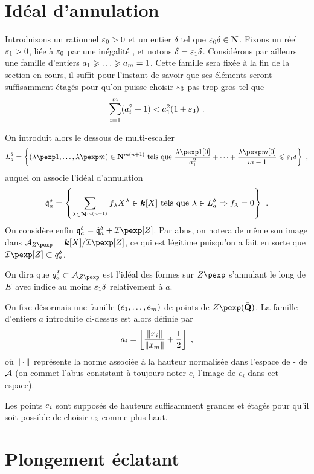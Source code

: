 \section{Idéal d'annulation}

Introduisons un rationnel $\varepsilon_0 > 0$ et un entier $\delta$ tel que
$\varepsilon_0\delta \in \mathbf{N}$. Fixons un réel $\varepsilon_1 > 0$, liée à $\varepsilon_0$ par une
inégalité , et notons $\tilde\delta =
\varepsilon_1\delta$.
Considérons par ailleurs une famille d'entiers $a_1 \ge \dots \ge a_\puiss =
1$. Cette famille sera fixée à la fin de la section en cours, il suffit pour
l'instant de savoir que ses éléments seront suffisamment étagés pour qu'on
puisse choisir $\varepsilon_3$ pas trop gros \todo[à expliciter] tel que
\[
  \sum_{i=1}^{m} (a_i^2 +1) < a_1^2 (1 + \varepsilon_3) \text{ .}
\]

On introduit alors le dessous de multi-escalier
\[
  L_a^\delta = \left\{
  (\lambda\pexp1, \ldots, \lambda\pexp\puiss) \in \N^{\puiss(\dimp+1)}
  \text{ tels que }
  \frac {\lambda\pexp1[0]} {a_1^2}
  + \dots +
  \frac {\lambda\pexp\puiss[0]} {m-1}
  \le \eps_1 \delta
  \right\}
  \pmm,
\]
auquel on associe l'idéal d'annulation
\[
  \mathfrak{\tilde q}_a^\delta
  = \left\{
  \sum_{\lambda \in \mathbf{N}^{m(n+1)}} f_\lambda X^\lambda \in \boldsymbol{k} [X]
  \text{ tels que }
  \lambda \in L_a^\delta \Rightarrow f_\lambda = 0
  \right\}
  \text{ .}
\]
On considère enfin $\mathfrak{q}_a^\delta = \mathfrak{\tilde q}_a^\delta +
\varid$. Par abus, on notera de même son image dans $\mathcal{A}_{\var} = \cdn
[X] / \varid$, ce qui est légitime puisqu'on a fait en sorte que $\varid
\subset q_a^\delta$.

On dira que $q_a^\delta \subset \mathcal{A}_{\var}$ est l'idéal des formes sur
$\var$ s'annulant le long de $E$ avec indice au moins $\varepsilon_1 \delta$
relativement à $a$.

On fixe désormais une famille $(e_1, \dots, e_m)$ de points de
$\var(\bar\Q)$. La famille d'entiers $a$ introduite ci-dessus est alors définie
par
\[
  a_i = \left\lfloor
  \frac {\left\lVert x_i\right\rVert} {\left\lVert x_m\right\rVert} + \frac12
  \right\rfloor
  \text{ ,}
\]
où $\left\lVert{\,\cdot\,}\right\rVert$ représente la norme associée à la hauteur normalisée dans
l'espace de - de ${\mathcal A}$ (on commet l'abus consistant à
toujours noter $e_i$ l'image de $e_i$ dans cet espace).

Les points $e_i$ sont supposés de hauteurs suffisamment grandes et étagés
pour qu'il soit possible de choisir $\varepsilon_3$ comme plus haut.

\section{Plongement éclatant}

